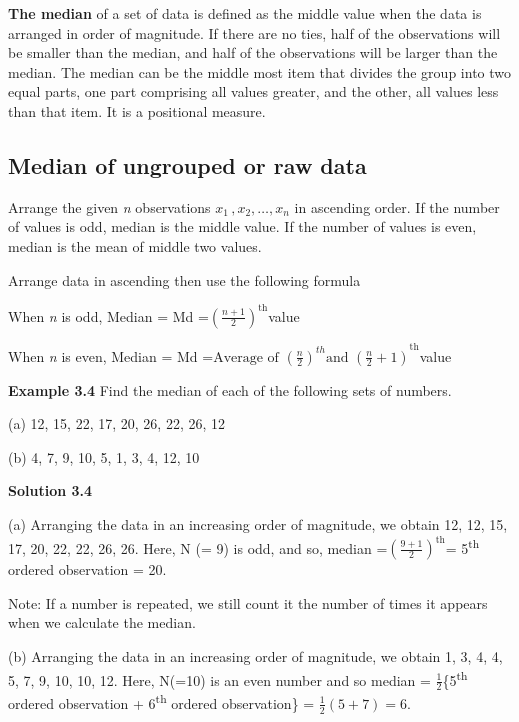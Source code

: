 \documentclass[
]{book}
\begin{document}
\textbf{The median} of a set of data is defined as the middle value when the
data is arranged in order of magnitude. If there are no ties, half of
the observations will be smaller than the median, and half of the
observations will be larger than the median. The median can be the
middle most item that divides the group into two equal parts, one part
comprising all values greater, and the other, all values less than that
item. It is a positional measure.

\hypertarget{median-of-ungrouped-or-raw-data}{%
\subsection{Median of ungrouped or raw data}\label{median-of-ungrouped-or-raw-data}}

Arrange the given \emph{n} observations \(x_{1\ },x_{2},\ldots,x_{n}\) in
ascending order. If the number of values is odd, median is the middle
value. If the number of values is even, median is the mean of middle two
values.

Arrange data in ascending then use the following formula

When \emph{n} is odd, Median = Md
=\(\left( \frac{n + 1}{2} \right)^{\text{th}}\)value

When \emph{n} is even, Median = Md
=\({\text{Average\ of\ }\left( \frac{n}{2} \right)^{th}\text{and\ }\left( \frac{n}{2} + 1 \right)}^{\text{th}}\)value

\textbf{Example 3.4} Find the median of each of the following sets of
numbers.

(a) 12, 15, 22, 17, 20, 26, 22, 26, 12

(b) 4, 7, 9, 10, 5, 1, 3, 4, 12, 10

\textbf{Solution 3.4}

(a) Arranging the data in an increasing order of magnitude, we
obtain 12, 12, 15, 17, 20, 22, 22, 26, 26. Here, N (= 9) is odd, and so,
median =\(\left( \frac{9 + 1}{2} \right)^{\text{th}}\)= 5\textsuperscript{th} ordered
observation = 20.

Note: If a number is repeated, we still count it the number of times it
appears when we calculate the median.

(b) Arranging the data in an increasing order of magnitude, we obtain
1, 3, 4, 4, 5, 7, 9, 10, 10, 12. Here, N(=10) is an even number and so
median = \(\frac{1}{2}\)\{5\textsuperscript{th} ordered observation + 6\textsuperscript{th} ordered
observation\} = \(\frac{1}{2}\left( 5 + 7 \right) = 6\).
\end{document}
